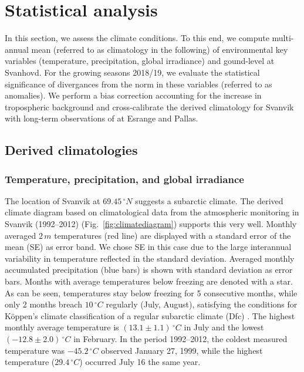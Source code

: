 \documentclass[bg, manuscript]{copernicus}
\begin{document}
\section{Statistical analysis}
\label{sec:stats}
In this section, we assess the climate conditions. To this end, we compute multi-annual mean (referred to as climatology in the following) of environmental key variables (temperature, precipitation, global irradiance) and gound-level \chem{[O_3]} at Svanhovd. For the growing seasons 2018/19, we evaluate the statistical significance of divergances from the norm in these variables (referred to as anomalies). We perform a bias correction accounting for the increase in tropospheric background \chem{[O_3]} and cross-calibrate the derived climatology for Svanvik with long-term observations of \chem{[O_3]} at Esrange and Pallas.

\subsection{Derived climatologies}
\label{subsec:climatologies}

\subsubsection{Temperature, precipitation, and global irradiance}
\label{subsubsec:clim_temp_prec}
The location of Svanvik at $69.45\,\unit{^\circ N}$ suggests a subarctic climate. The derived climate diagram based on climatological data from the atmospheric monitoring in Svanvik (1992--2012) (Fig.~\ref{fig:climatediagram}) supports this very well. Monthly averaged $2\,\unit{m}$ temperatures (red line) are displayed with a standard error of the mean (SE) as error band. We chose SE in this case due to the large interannual variability in temperature reflected in the standard deviation. Averaged monthly accumulated precipitation (blue bars) is shown with standard deviation as error bars. Months with average temperatures below freezing are denoted with a star. As can be seen, temperatures stay below freezing for 5 consecutive months, while only 2 months breach $10\,\unit{^\circ C}$ regularly (July, August), satisfying the conditions for K\"{o}ppen's climate classification of a regular subarctic climate (Dfc) \citep[][e.g.]{SD:Beck2018}. The highest monthly average temperature is $(13.1\pm 1.1)\,\unit{^\circ C}$ in July and the lowest $(-12.8\pm 2.0)\,\unit{^\circ C}$ in February. In the period 1992--2012, the coldest measured temperature was $-45.2\,\unit{^\circ C}$ observed January 27, 1999, while the highest temperature ($29.4\,\unit{^\circ C}$) occurred July 16 the same year.
\end{document}
